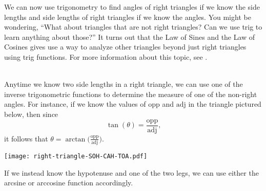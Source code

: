 \documentclass{ximera}
\begin{document}
We can now use trigonometry to find angles of right triangles if we know the side lengths and side lengths of right triangles if we know the angles.  You might be wondering, ``What about triangles that are not right triangles? Can we use trig to learn anything about those?''  It turns out that the Law of Sines and the Law of Cosines gives use a way to analyze other triangles beyond just right triangles using trig functions.  For more information about this topic, see .


\begin{summary}\\
Anytime we know two side lengths in a right triangle, we can use one of the inverse trigonometric functions to determine the measure of one of the non-right angles.  For instance, if we know the values of $\text{opp}$ and $\text{adj}$ in the triangle pictured below, then since%
\begin{equation*}
\tan(\theta) = \frac{\text{opp}}{\text{adj}}\text{,}
\end{equation*}
it follows that $\theta = \arctan\!\bigg(\frac{\text{opp}}{\text{adj}}\bigg)$.%
%
\begin{image}
\texttt{[image: right-triangle-SOH-CAH-TOA.pdf]}
\end{image}
%
\par
%
If we instead know the hypotenuse and one of the two legs, we can use either the arcsine or arccosine function accordingly.%
%

\end{summary}
\end{document}
